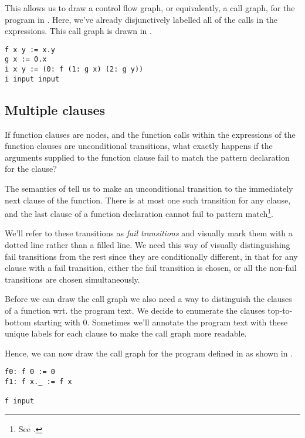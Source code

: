 This allows us to draw a control flow graph, or equivalently, a call graph,
for the program in . Here, we've already
disjunctively labelled all of the calls in the expressions. This call graph is
drawn in .

\begin{lstlisting}[label=listing:cfg-sample-2,caption={A sample \D{} program, always returning \mono{(0.x).(0.y)}, where \mono{x} and \mono{y} are arbitrary \D{} values supplied by the user.}]
f x y := x.y
g x := 0.x
i x y := (0: f (1: g x) (2: g y))
i input input
\end{lstlisting}



\subsection{Multiple clauses}

If function clauses are nodes, and the function calls within the expressions of
the function clauses are unconditional transitions, what exactly happens if the
arguments supplied to the function clause fail to match the pattern declaration
for the clause?

The semantics of \D{} tell us to make an unconditional transition to the
immediately next clause of the function. There is at most one such transition
for any clause, and the last clause of a function declaration cannot fail to
pattern match\footnote{See .}.

We'll refer to these transitions as \emph{fail transitions} and visually mark
them with a dotted line rather than a filled line. We need this way of visually
distinguishing fail transitions from the rest since they are conditionally
different, in that for any clause with a fail transition, either the fail
transition is chosen, or all the non-fail transitions are chosen
simultaneously.

Before we can draw the call graph we also need a way to distinguish the clauses
of a function wrt. the program text. We decide to enumerate the clauses
top-to-bottom starting with 0. Sometimes we'll annotate the program text with
these unique labels for each clause to make the call graph more readable.

Hence, we can now draw the call graph for the program defined in
 as shown in .

\begin{lstlisting}[label=listing:cfg-loop,caption={A simple, down-counting loop in \D{}.}]
f0: f 0 := 0
f1: f x._ := f x

f input
\end{lstlisting}

